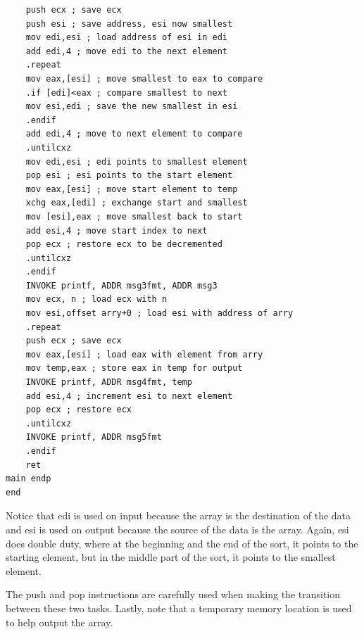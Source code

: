 \documentclass[10pt]{book}
\begin{document}
\begin{center}
\begin{center}
\begin{center}
\begin{verbatim}
    push ecx ; save ecx
    push esi ; save address, esi now smallest
    mov edi,esi ; load address of esi in edi
    add edi,4 ; move edi to the next element
    .repeat
    mov eax,[esi] ; move smallest to eax to compare
    .if [edi]<eax ; compare smallest to next
    mov esi,edi ; save the new smallest in esi
    .endif
    add edi,4 ; move to next element to compare
    .untilcxz
    mov edi,esi ; edi points to smallest element
    pop esi ; esi points to the start element
    mov eax,[esi] ; move start element to temp
    xchg eax,[edi] ; exchange start and smallest
    mov [esi],eax ; move smallest back to start
    add esi,4 ; move start index to next
    pop ecx ; restore ecx to be decremented
    .untilcxz
    .endif
    INVOKE printf, ADDR msg3fmt, ADDR msg3
    mov ecx, n ; load ecx with n
    mov esi,offset arry+0 ; load esi with address of arry
    .repeat
    push ecx ; save ecx
    mov eax,[esi] ; load eax with element from arry
    mov temp,eax ; store eax in temp for output
    INVOKE printf, ADDR msg4fmt, temp
    add esi,4 ; increment esi to next element
    pop ecx ; restore ecx
    .untilcxz
    INVOKE printf, ADDR msg5fmt
    .endif
    ret
main endp
end
\end{verbatim}

Notice that edi is used on input because the array is the destination of the data and esi is used on output because the source of the data is the array. Again, esi does double duty, where at the beginning and the end of the sort, it points to the starting element, but in the middle part of the sort, it points to the smallest element.


The push and pop instructions are carefully used when making the transition between these two tasks. Lastly, note that a temporary memory location is used to help output the array.


\end{center}
\end{center}
\end{center}
\end{document}

